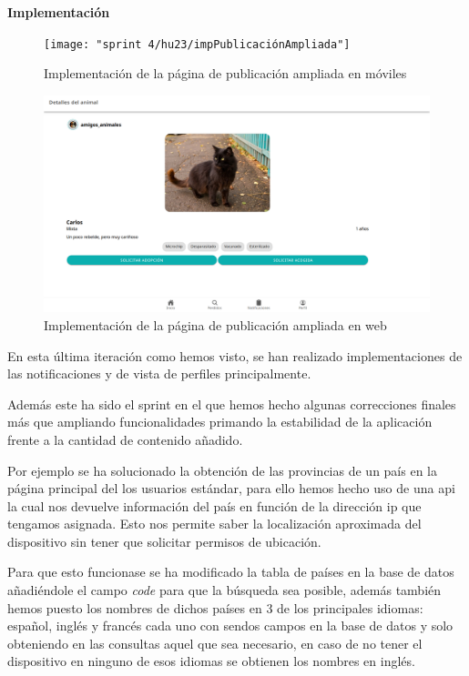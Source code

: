 \textbf{Implementación}
\begin{figure}[H]
	\centering
	\texttt{[image: "sprint 4/hu23/impPublicaciónAmpliada"]}
	\caption{Implementación de la página de publicación ampliada en móviles}
	\label{fig:imppublicacionampliada}
\end{figure}

\begin{figure}[H]
	\centering
	\includegraphics[width=1\linewidth]{"sprint 4/hu23/publicacionAmpliadaWeb"}
	\caption{Implementación de la página de publicación ampliada en web}
	\label{fig:publicacionampliadaweb}
\end{figure}

En esta última iteración como hemos visto, se han realizado implementaciones de las notificaciones y de vista de perfiles principalmente. 

Además este ha sido el sprint en el que hemos hecho algunas correcciones finales más que ampliando funcionalidades primando la estabilidad de la aplicación frente a la cantidad de contenido añadido.

Por ejemplo se ha solucionado la obtención de las provincias de un país en la página principal del los usuarios estándar, para ello hemos hecho uso de una api \cite{apiIp} la cual nos devuelve información del país en función de la dirección ip que tengamos asignada. Esto nos permite saber la localización aproximada del dispositivo sin tener que solicitar permisos de ubicación.

Para que esto funcionase se ha modificado la tabla de países en la base de datos añadiéndole el campo \textit{code} para que la búsqueda sea posible, además también hemos puesto los nombres de dichos países en 3 de los principales idiomas: español, inglés y francés cada uno con sendos campos en la base de datos y solo obteniendo en las consultas aquel que sea necesario, en caso de no tener el dispositivo en ninguno de esos idiomas se obtienen los nombres en inglés.

